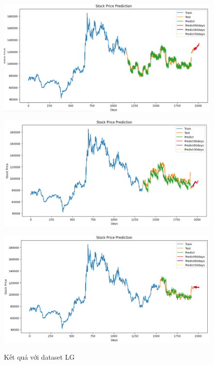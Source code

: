\documentclass[conference]{IEEEtran}
\begin{document}
\begin{figure}[H]
    \centering
    \begin{minipage}{0.15\textwidth}
    \centering
    \includegraphics[width=1\textwidth]{Image/NBeat/N_BEAT_LG_6_4.png}
   
    \label{fig:1}
    \end{minipage}%
    \begin{minipage}{0.15\textwidth}
    \centering
    \includegraphics[width=1\textwidth]{Image/NBeat/N_BEAT_LG_7_3.png}
  
    \label{fig:2}
    \end{minipage}%
    \begin{minipage}{0.15\textwidth}
    \centering
    \includegraphics[width=1\textwidth]{Image/NBeat/N_BEAT_LG_8_2.png}

    \label{fig:3}
    \end{minipage}
    \caption{Kết quả với dataset LG }
\end{figure}
\end{document}
